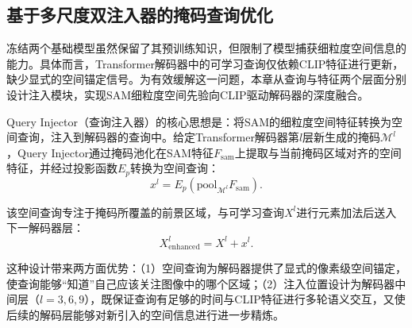 


\subsection{基于多尺度双注入器的掩码查询优化}

\label{sec:chap4_dual_injector}

冻结两个基础模型虽然保留了其预训练知识，但限制了模型捕获细粒度空间信息的能力。具体而言，Transformer解码器中的可学习查询仅依赖CLIP特征进行更新，缺少显式的空间锚定信号。为有效缓解这一问题，本章从查询与特征两个层面分别设计注入模块，实现SAM细粒度空间先验向CLIP驱动解码器的深度融合。

Query Injector（查询注入器）的核心思想是：将SAM的细粒度空间特征转换为空间查询，注入到解码器的查询中。给定Transformer解码器第$l$层新生成的掩码$\mathcal{M}^l$，Query Injector通过掩码池化在SAM特征$F_{\text{sam}}$上提取与当前掩码区域对齐的空间特征，并经过投影函数$E_p$转换为空间查询：
\begin{equation}
x^l = E_p(\mathrm{pool}_{\mathcal{M}^l} F_{\mathrm{sam}}).
\label{eq:query_injector}
\end{equation}

该空间查询专注于掩码所覆盖的前景区域，与可学习查询$X^l$进行元素加法后送入下一解码器层：
\begin{equation}
X^l_{\text{enhanced}} = X^l + x^l.
\end{equation}

这种设计带来两方面优势：（1）空间查询为解码器提供了显式的像素级空间锚定，使查询能够“知道”自己应该关注图像中的哪个区域；（2）注入位置设计为解码器中间层（$l=3,6,9$），既保证查询有足够的时间与CLIP特征进行多轮语义交互，又使后续的解码层能够对新引入的空间信息进行进一步精炼。

